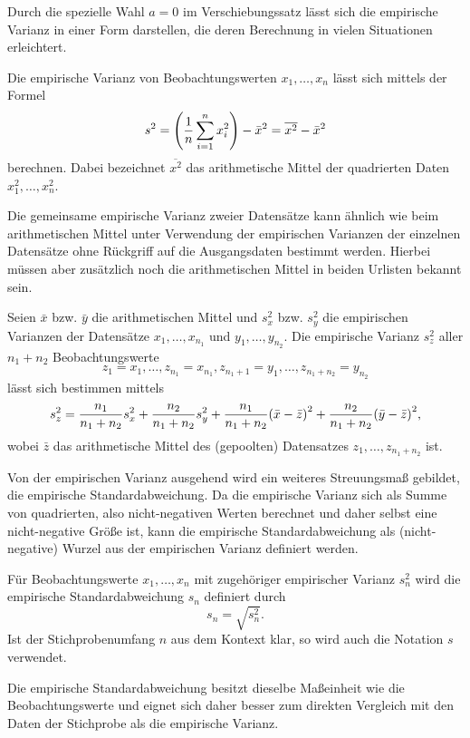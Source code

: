 \documentclass{lecture}
\begin{document}
    Durch die spezielle Wahl \(a = 0\) im Verschiebungssatz lässt sich die empirische Varianz in einer Form darstellen, die deren Berechnung in vielen Situationen erleichtert.

    \begin{calcrule}
        Die empirische Varianz von Beobachtungswerten \(x_1, \ldots, x_n\) lässt sich mittels der Formel
        \[
            s^2 = \parentheses*{\frac{1}{n}\sum_{i = 1}^n x_i^2} - \bar{x}^2 = \overline{x^2} - \bar{x}^2
        \]
        berechnen.
        Dabei bezeichnet \(\overline{x^2}\) das arithmetische Mittel der quadrierten Daten \(x_1^2, \ldots, x_n^2\).
    \end{calcrule}

    Die gemeinsame empirische Varianz zweier Datensätze kann ähnlich wie beim arithmetischen Mittel unter Verwendung der empirischen Varianzen der einzelnen Datensätze ohne Rückgriff auf die Ausgangsdaten bestimmt werden.
    Hierbei müssen aber zusätzlich noch die arithmetischen Mittel in beiden Urlisten bekannt sein.

    \begin{calcrule}
        Seien \(\bar{x}\) bzw. \(\bar{y}\) die arithmetischen Mittel und \(s_x^2\) bzw. \(s_y^2\) die empirischen Varianzen der Datensätze \(x_1, \ldots, x_{n_1}\) und \(y_1, \ldots, y_{n_2}\).
        Die empirische Varianz \(s_z^2\) aller \(n_1 + n_2\) Beobachtungswerte
        \[
            z_1 = x_1, \ldots, z_{n_1} = x_{n_1}, z_{n_1 + 1} = y_1, \ldots, z_{n_1 + n_2} = y_{n_2}
        \]
        lässt sich bestimmen mittels
        \[
            s_z^2 = \frac{n_1}{n_1 + n_2}s_x^2 + \frac{n_2}{n_1 + n_2}s_y^2 + \frac{n_1}{n_1 + n_2}\parentheses*{\bar{x} - \bar{z}}^2 + \frac{n_2}{n_1 + n_2}\parentheses*{\bar{y} - \bar{z}}^2,
        \]
        wobei \(\bar{z}\) das arithmetische Mittel des (gepoolten) Datensatzes \(z_1, \ldots, z_{n_1 + n_2}\) ist.
    \end{calcrule}

    Von der empirischen Varianz ausgehend wird ein weiteres Streuungsmaß gebildet, die empirische Standardabweichung.
    Da die empirische Varianz sich als Summe von quadrierten, also nicht-negativen Werten berechnet und daher selbst eine nicht-negative Größe ist, kann die empirische Standardabweichung als (nicht-negative) Wurzel aus der empirischen Varianz definiert werden.

    \begin{definition}
        Für Beobachtungswerte \(x_1, \ldots, x_n\) mit zugehöriger empirischer Varianz \(s_n^2\) wird die empirische Standardabweichung \(s_n\) definiert durch
        \[
            s_n = \sqrt{s_n^2}.
        \]
        Ist der Stichprobenumfang \(n\) aus dem Kontext klar, so wird auch die Notation \(s\) verwendet.
    \end{definition}

    Die empirische Standardabweichung besitzt dieselbe Maßeinheit wie die Beobachtungswerte und eignet sich daher besser zum direkten Vergleich mit den Daten der Stichprobe als die empirische Varianz.
\end{document}
